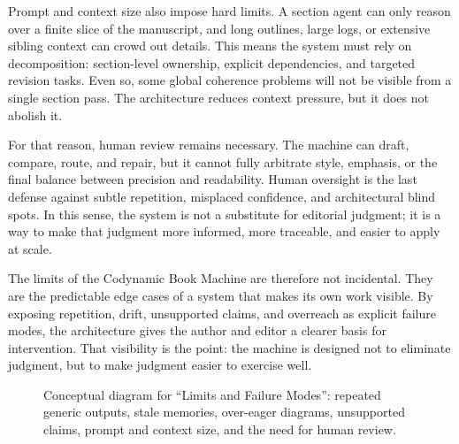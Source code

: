 \documentclass[11pt]{article}
\begin{document}
Prompt and context size also impose hard limits. A section agent can only reason over a finite slice of the manuscript, and long outlines, large logs, or extensive sibling context can crowd out details. This means the system must rely on decomposition: section-level ownership, explicit dependencies, and targeted revision tasks. Even so, some global coherence problems will not be visible from a single section pass. The architecture reduces context pressure, but it does not abolish it.

For that reason, human review remains necessary. The machine can draft, compare, route, and repair, but it cannot fully arbitrate style, emphasis, or the final balance between precision and readability. Human oversight is the last defense against subtle repetition, misplaced confidence, and architectural blind spots. In this sense, the system is not a substitute for editorial judgment; it is a way to make that judgment more informed, more traceable, and easier to apply at scale.

The limits of the Codynamic Book Machine are therefore not incidental. They are the predictable edge cases of a system that makes its own work visible. By exposing repetition, drift, unsupported claims, and overreach as explicit failure modes, the architecture gives the author and editor a clearer basis for intervention. That visibility is the point: the machine is designed not to eliminate judgment, but to make judgment easier to exercise well.

\begin{figure}[htbp]
\centering

\caption{Conceptual diagram for ``Limits and Failure Modes'': repeated generic outputs, stale memories, over-eager diagrams, unsupported claims, prompt and context size, and the need for human review.}
\end{figure}
\end{document}
